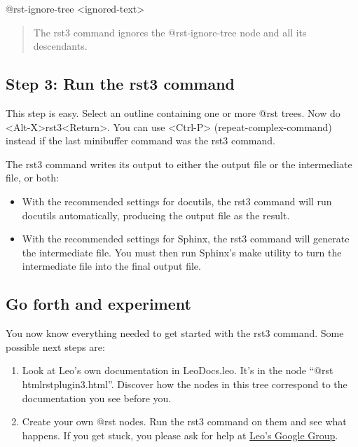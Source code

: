 \documentclass[a4paper,10pt,english]{sphinxmanual}
\begin{document}
@rst-ignore-tree \textless{}ignored-text\textgreater{}
\begin{quote}

The rst3 command ignores the @rst-ignore-tree node and all its descendants.
\end{quote}


\subsection{Step 3: Run the rst3 command}
\label{rstplugin3:step-3-run-the-rst3-command}
This step is easy. Select an outline containing one or more @rst trees. Now do
\textless{}Alt-X\textgreater{}rst3\textless{}Return\textgreater{}. You can use \textless{}Ctrl-P\textgreater{} (repeat-complex-command) instead if
the last minibuffer command was the rst3 command.

The rst3 command writes its output to either the output file or the intermediate
file, or both:
\begin{itemize}
\item {} 
With the recommended settings for docutils, the rst3 command will run docutils
automatically, producing the output file as the result.

\item {} 
With the recommended settings for Sphinx, the rst3 command will generate the
intermediate file. You must then run Sphinx's make utility to turn the
intermediate file into the final output file.

\end{itemize}


\subsection{Go forth and experiment}
\label{rstplugin3:go-forth-and-experiment}
You now know everything needed to get started with the rst3 command.
Some possible next steps are:
\begin{enumerate}
\item {} 
Look at Leo's own documentation in LeoDocs.leo. It's in the node ``@rst
htmlrstplugin3.html''. Discover how the nodes in this tree correspond to the
documentation you see before you.

\item {} 
Create your own @rst nodes. Run the rst3 command on them and see what
happens. If you get stuck, you please ask for help at
\href{http://groups.google.com/group/leo-editor}{Leo's Google Group}.

\end{enumerate}
\end{document}
